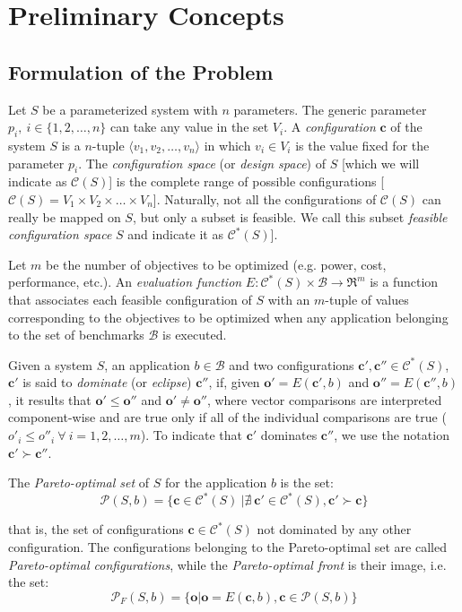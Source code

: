 
\section{Preliminary Concepts}

\subsection{Formulation of the Problem}

\label{sec:statement_of_the_problem}

Let $S$ be a parameterized system with $n$ parameters. The generic
parameter $p_i, \ i \in \{1,2,\ldots,n\}$ can take any value in
the set $V_i$. A {\em configuration} $\mathbf{c}$ of the system
$S$ is a $n$-tuple $\langle v_1,v_2,\ldots,v_n \rangle$ in which
$v_i \in V_i$ is the value fixed for the parameter $p_i$. The {\em
configuration space} (or {\em design space}) of $S$ [which we will
indicate as $\mathcal{C}(S)$] is the complete range of possible
configurations [$\mathcal{C}(S) = V_1 \times V_2 \times \ldots
\times V_n$]. Naturally, not all the configurations of
$\mathcal{C}(S)$ can really be mapped on $S$, but only a subset 
is feasible. We call this subset {\em
feasible configuration space} $S$ and indicate it as
$\mathcal{C}^*(S)$].

Let $m$ be the number of objectives to be optimized (e.g. power,
cost, performance, etc.). An {\em evaluation function}
$E:\mathcal{C}^*(S)\times \mathcal{B} \longrightarrow \Re^m$ is a
function that associates each feasible configuration of $S$ with
an $m$-tuple of values corresponding to the objectives to be
optimized when any application belonging to the set of benchmarks
$\mathcal{B}$ is executed.

Given a system $S$, an application $b \in \mathcal{B}$ and two
configurations $\mathbf{c}', \mathbf{c}'' \in \mathcal{C}^*(S)$,
$\mathbf{c}'$ is said to {\em dominate} (or {\em eclipse})
$\mathbf{c}''$, if, given $\mathbf{o}'=E(\mathbf{c}', b)$ and
$\mathbf{o}''=E(\mathbf{c}'', b)$, it results that $\mathbf{o}'
\leq \mathbf{o}''$ and $\mathbf{o}' \neq \mathbf{o}''$, where
vector comparisons are interpreted component-wise and are true
only if all of the individual comparisons are true ($o'_i \leq
o''_i \ \forall \ i = 1,2,\ldots,m$). To indicate that 
$\mathbf{c}'$ dominates $\mathbf{c}''$, we use the notation
$\mathbf{c}' \succ \mathbf{c}''$.

\begin{definition}
\label{pers02.def:Pareto-set}
The {\em Pareto-optimal set} of $S$ for the application $b$ is the
set:
\[ \mathcal{P}(S,b) = \{ \mathbf{c} \in \mathcal{C}^*(S) \ | \nexists \ \mathbf{c}' \in \mathcal{C}^*(S), \mathbf{c}' \succ \mathbf{c} \} \]
\end{definition}
that is, the set of configurations $\mathbf{c} \in
\mathcal{C}^*(S)$ not dominated by any other 
 configuration.
The configurations belonging to the Pareto-optimal set are called \emph{Pareto-optimal configurations}, while the {\em Pareto-optimal front} is their image, i.e. the set:
\[ \mathcal{P}_{F}(S,b) = \{ \mathbf{o} | \mathbf{o} = E(\mathbf{c},b), \mathbf{c} \in \mathcal{P}(S,b) \} \]


